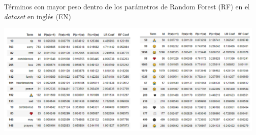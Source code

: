 \begin{table}[H]
    \centering
    \caption{Términos con mayor peso dentro de los parámetros de Random Forest (RF) en el \textit{dataset} en inglés (EN)}
    \label{tab:lr_coef_en}
    \includegraphics[width=\textwidth]{doc/images/RF_Coef_en.png}
\end{table}